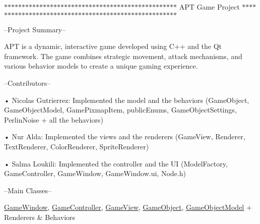 $\ast$$\ast$$\ast$$\ast$$\ast$$\ast$$\ast$$\ast$$\ast$$\ast$$\ast$$\ast$$\ast$$\ast$$\ast$$\ast$$\ast$$\ast$$\ast$$\ast$$\ast$$\ast$$\ast$$\ast$$\ast$$\ast$$\ast$$\ast$$\ast$$\ast$$\ast$$\ast$$\ast$$\ast$$\ast$$\ast$$\ast$$\ast$$\ast$$\ast$$\ast$$\ast$$\ast$$\ast$$\ast$$\ast$$\ast$$\ast$$\ast$ APT Game Project $\ast$$\ast$$\ast$$\ast$$\ast$$\ast$$\ast$$\ast$$\ast$$\ast$$\ast$$\ast$$\ast$$\ast$$\ast$$\ast$$\ast$$\ast$$\ast$$\ast$$\ast$$\ast$$\ast$$\ast$$\ast$$\ast$$\ast$$\ast$$\ast$$\ast$$\ast$$\ast$$\ast$$\ast$$\ast$$\ast$$\ast$$\ast$$\ast$$\ast$$\ast$$\ast$$\ast$$\ast$$\ast$$\ast$$\ast$$\ast$$\ast$$\ast$$\ast$$\ast$$\ast$

--Project Summary--

APT is a dynamic, interactive game developed using C++ and the Qt framework. The game combines strategic movement, attack mechanisms, and various behavior models to create a unique gaming experience.

--Contributors-- \begin{DoxyVerb}• Nicolas Gutrierrez: Implemented the model and the behaviors (GameObject, GameObjectModel, GamePixmapItem, publicEnums, GameObjectSettings, PerlinNoise + all the behaviors)

• Nur Alda: Implemented the views and the renderers (GameView, Renderer, TextRenderer, ColorRenderer, SpriteRenderer)

• Salma Loukili: Implemented the controller and the UI (ModelFactory, GameController, GameWindow, GameWindow.ui, Node.h)
\end{DoxyVerb}


--Main Classes--

\mbox{\hyperlink{classGameWindow}{Game\+Window}}, \mbox{\hyperlink{classGameController}{Game\+Controller}}, \mbox{\hyperlink{classGameView}{Game\+View}}, \mbox{\hyperlink{classGameObject}{Game\+Object}}, \mbox{\hyperlink{classGameObjectModel}{Game\+Object\+Model}} + Renderers \& Behaviors


